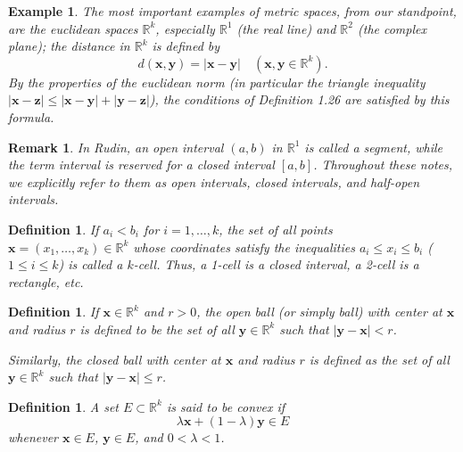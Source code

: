 \documentclass{article}
\theoremstyle{mythm}
\newtheorem{definition}[theorem]{Definition}
\newtheorem{remark}[theorem]{Remark}
\newtheorem{example}[theorem]{Example}
\begin{document}
\begin{example}
The most important examples of metric spaces, from our standpoint, are the euclidean spaces $\mathbb{R}^k$, especially $\mathbb{R}^1$ (the real line) and $\mathbb{R}^2$ (the complex plane); the distance in $\mathbb{R}^k$ is defined by
\[
d(\mathbf{x}, \mathbf{y}) = |\mathbf{x} - \mathbf{y}| \quad (\mathbf{x}, \mathbf{y} \in \mathbb{R}^k).
\]
By the properties of the euclidean norm (in particular the triangle inequality $|\mathbf{x} - \mathbf{z}| \leq |\mathbf{x} - \mathbf{y}| + |\mathbf{y} - \mathbf{z}|$), the conditions of Definition 1.26 are satisfied by this formula.
\end{example}
\begin{remark}
In Rudin, an open interval $(a, b)$ in $\mathbb{R}^1$ is called a \textit{segment}, while the term \textit{interval} is reserved for a closed interval $[a, b]$. Throughout these notes, we explicitly refer to them as \textit{open intervals}, \textit{closed intervals}, and \textit{half-open intervals}.
\end{remark}
\begin{definition}
If $a_i < b_i$ for $i = 1, \dots, k$, the set of all points $\mathbf{x} = (x_1, \dots, x_k) \in \mathbb{R}^k$ whose coordinates satisfy the inequalities $a_i \le x_i \le b_i$ ($1 \le i \le k$) is called a \textit{$k$-cell}. Thus, a 1-cell is a closed interval, a 2-cell is a rectangle, etc.
\end{definition}

\begin{definition}
If $\mathbf{x} \in \mathbb{R}^k$ and $r > 0$, the \textit{open ball} (or simply \textit{ball}) with center at $\mathbf{x}$ and radius $r$ is defined to be the set of all $\mathbf{y} \in \mathbb{R}^k$ such that $|\mathbf{y} - \mathbf{x}| < r$. 

Similarly, the \textit{closed ball} with center at $\mathbf{x}$ and radius $r$ is defined as the set of all $\mathbf{y} \in \mathbb{R}^k$ such that $|\mathbf{y} - \mathbf{x}| \le r$.
\end{definition}

\begin{definition}
A set $E \subset \mathbb{R}^k$ is said to be \textit{convex} if
\[
\lambda \mathbf{x} + (1 - \lambda)\mathbf{y} \in E
\]
whenever $\mathbf{x} \in E$, $\mathbf{y} \in E$, and $0 < \lambda < 1$.
\end{definition}
\end{document}
